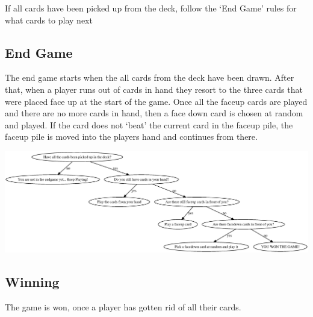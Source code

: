 \documentclass{article}
\begin{document}
If all cards have been picked up from the deck, follow the `End Game' rules for what cards to play next

\subsection*{End Game}
The end game starts when the all cards from the deck have been drawn. After that, when a player runs out of cards in hand they resort to the three cards that were placed face up at the start of the game. Once all the faceup cards are played and there are no more cards in hand, then a face down card is chosen at random and played. If the card does not `beat' the current card in the faceup pile, the faceup pile is moved into the players hand and continues from there.

\includegraphics[width=6.5in]{Endgame.eps}

\subsection*{Winning}
The game is won, once a player has gotten rid of all their cards.
\end{document}
